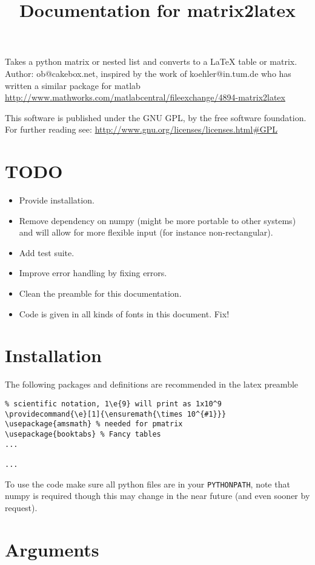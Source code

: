 
\title{Documentation for matrix2latex}


\maketitle
Takes a python matrix or nested list and converts to a LaTeX table or matrix.
Author: ob@cakebox.net, inspired by the work of koehler@in.tum.de who has written
a similar package for matlab
\url{http://www.mathworks.com/matlabcentral/fileexchange/4894-matrix2latex}

This software is published under the GNU GPL, by the free software
foundation. For further reading see: 
\url{http://www.gnu.org/licenses/licenses.html#GPL}

\section{TODO}
\begin{itemize}
\item Provide installation.
\item Remove dependency on numpy (might be more portable to other systems)
and will allow for more flexible input (for instance non-rectangular).
\item Add test suite.
\item Improve error handling by fixing errors.
\item Clean the preamble for this documentation.
\item Code is given in all kinds of fonts in this document. Fix!
\end{itemize}

\section{Installation}
The following packages and definitions are recommended in the latex preamble 
\begin{verbatim}
% scientific notation, 1\e{9} will print as 1x10^9
\providecommand{\e}[1]{\ensuremath{\times 10^{#1}}}
\usepackage{amsmath} % needed for pmatrix
\usepackage{booktabs} % Fancy tables
...

...
\end{verbatim}
To use the code make sure all python files are in your \verb!PYTHONPATH!,
note that numpy is required though this may change in the near future 
(and even sooner by request).

\section{Arguments}
  
